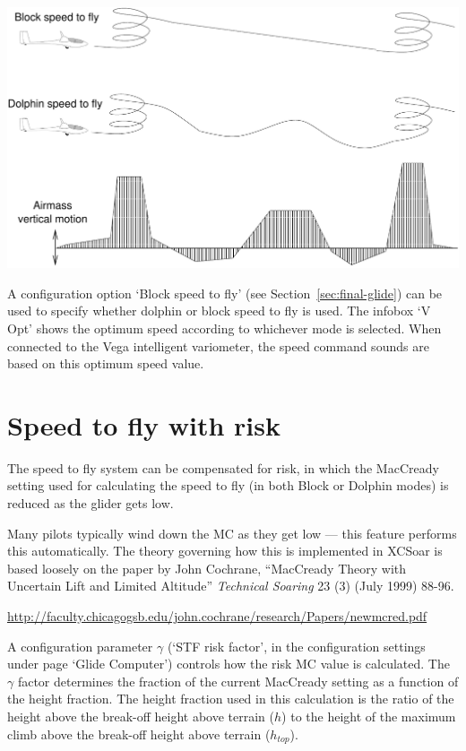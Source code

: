 \documentclass[a4paper,12pt]{refrep}
\begin{document}
\begin{maxipage}
\begin{center}
\includegraphics[angle=0,width=0.8\linewidth,keepaspectratio='true']{figures/blockmc.pdf}
\end{center}
\end{maxipage}

A configuration option `Block speed to fly' (see
Section~\ref{sec:final-glide}) can be used to specify whether dolphin
or block speed to fly is used.  The infobox `V Opt' shows the optimum
speed according to whichever mode is selected.  When connected to the
Vega intelligent variometer, the speed command sounds are based on
this optimum speed value.

\section{Speed to fly with risk}\label{sec:speed-fly-with}
  The speed to fly system can be compensated for risk, in which the
  MacCready setting used for calculating the speed to fly (in both
  Block or Dolphin modes) is reduced as the glider gets low.

  Many pilots typically wind down the MC as they get low --- this
  feature performs this automatically.  The theory governing how this
  is implemented in XCSoar is based loosely on the paper by John
  Cochrane, ``MacCready Theory with Uncertain Lift and Limited
  Altitude'' {\em Technical Soaring} 23 (3) (July 1999) 88-96.

\url{http://faculty.chicagogsb.edu/john.cochrane/research/Papers/newmcred.pdf}

  A configuration parameter $\gamma$ (`STF risk factor', in the
  configuration settings under page `Glide Computer') controls how the
  risk MC value is calculated.  The $\gamma$ factor determines the
  fraction of the current MacCready setting as a function of the
  height fraction.  The height fraction used in this calculation is
  the ratio of the height above the break-off height above terrain
  ($h$) to the height of the maximum climb above the break-off height
  above terrain ($h_{top}$).
\end{document}

